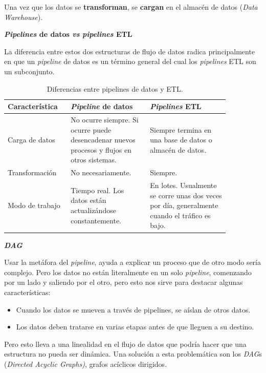 \documentclass[a4paper,12pt]{article}
\begin{document}
		Una vez que los datos se \textbf{transforman}, se \textbf{cargan} en el almacén de datos (\textit{Data Warehouse}).
				
		\textbf{\textit{Pipelines} de datos \textit{vs} \textit{pipelines} ETL}
				
		La diferencia entre estos dos estructuras de flujo de datos radica principalmente en que un \textit{pipeline} de datos es un término general del cual los \textit{pipelines} ETL son un subconjunto. \citep{Tobin2020Jun}
				
		\begin{table}[H]
			\centering
			\begin{tabular}{p{0.22\linewidth}|p{0.32\linewidth}|p{0.32\linewidth}}
				\hline
				\textbf{Característica} & \textbf{\textit{Pipeline} de datos} & \textbf{\textit{Pipelines} ETL} \\ \hline
				Carga de datos &
				No ocurre siempre. Si ocurre puede desencadenar nuevos procesos y flujos en otros sistemas. &
				Siempre termina en una base de datos o almacén de datos. \\
				Transformación          & No necesariamente.                  & Siempre.                        \\
				Modo de trabajo &
				Tiempo real. Los datos están actualizándose constantemente. &
				En lotes. Usualmente se corre unas dos veces por día, generalmente cuando el tráfico es bajo. \\ \hline
			\end{tabular}
			\caption{Diferencias entre pipelines de datos y ETL.}
			\label{tab:pipelines-table}
		\end{table}
				
		\textbf{\textit{DAG}}
				
		Usar la metáfora del \textit{pipeline}, ayuda a explicar un proceso que de otro modo sería complejo. Pero los datos no están literalmente en un solo \textit{pipeline}, comenzando por un lado y saliendo por el otro, pero esto nos sirve para destacar algunas características: \citep{astronomer}
		\begin{itemize}[noitemsep, topsep=2pt]
			\item Cuando los datos se mueven a través de pipelines, se aíslan de otros datos.
			\item Los datos deben tratarse en varias etapas antes de que lleguen a su destino.
		\end{itemize}
				
		Pero esto lleva a una linealidad en el flujo de datos que podría hacer que una estructura no pueda ser dinámica. Una solución a esta problemática son los \textit{DAG}s (\textit{Directed Acyclic Graphs)}, grafos acíclicos dirigidos.
				
\end{document}
